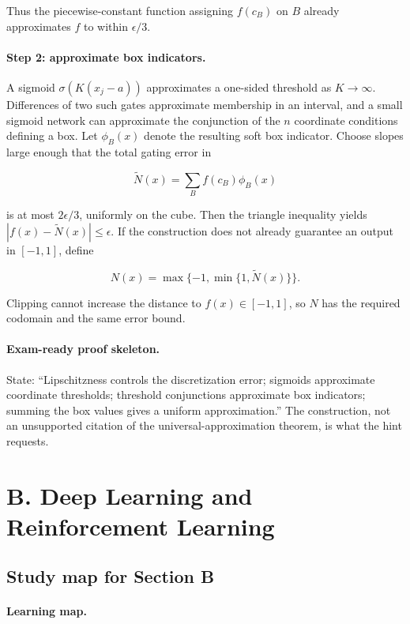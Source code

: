 \documentclass[11pt,a4paper]{article}
\begin{document}
Thus the piecewise-constant function assigning $f(c_B)$ on $B$ already approximates $f$ to within $\epsilon/3$.

\paragraph{Step 2: approximate box indicators.}

A sigmoid $\sigma(K(x_j-a))$ approximates a one-sided threshold as $K\to\infty$. Differences of two such gates approximate membership in an interval, and a small sigmoid network can approximate the conjunction of the $n$ coordinate conditions defining a box. Let $\phi_B(x)$ denote the resulting soft box indicator. Choose slopes large enough that the total gating error in

\[
\widetilde N(x)=\sum_B f(c_B)\phi_B(x)
\]

is at most $2\epsilon/3$, uniformly on the cube. Then the triangle inequality yields $|f(x)-\widetilde N(x)|\leq\epsilon$. If the construction does not already guarantee an output in $[-1,1]$, define

\[
N(x)=\max\{-1,\min\{1,\widetilde N(x)\}\}.
\]

Clipping cannot increase the distance to $f(x)\in[-1,1]$, so $N$ has the required codomain and the same error bound.

\paragraph{Exam-ready proof skeleton.}

State: ``Lipschitzness controls the discretization error; sigmoids approximate coordinate thresholds; threshold conjunctions approximate box indicators; summing the box values gives a uniform approximation.'' The construction, not an unsupported citation of the universal-approximation theorem, is what the hint requests.



\section{B. Deep Learning and Reinforcement Learning}


\subsection{Study map for Section B}

\paragraph{Learning map.}
\end{document}
